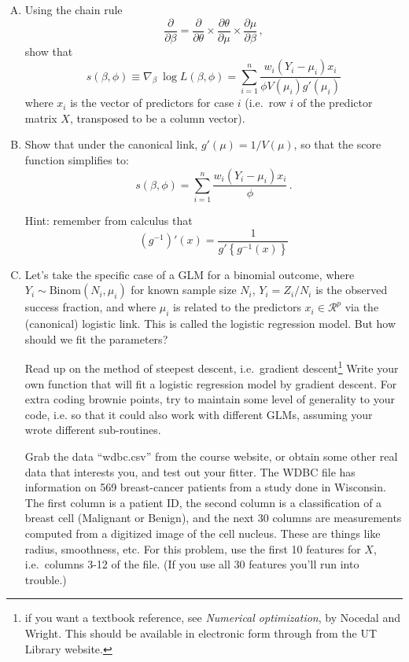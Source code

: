 \documentclass[11pt]{article}
\begin{document}
\begin{enumerate}[(A)]

\item Using the chain rule
$$
\frac{\partial}{\partial \beta} = \frac{\partial}{\partial \theta} \times \frac{\partial \theta}{\partial \mu } \times \frac{\partial \mu}{\partial \beta} \, ,
$$
show that 
$$
s(\beta, \phi) \equiv \nabla_\beta \  \log L(\beta, \phi)  = \sum_{i=1}^n \frac{w_i(Y_i - \mu_i) x_i}{ \phi V(\mu_i) g'(\mu_i)}
$$
where $x_i$ is the vector of predictors for case $i$ (i.e.~row $i$ of the predictor matrix $X$, transposed to be a column vector). 

\item Show that under the canonical link, $g'(\mu) = 1/V(\mu)$, so that the score function simplifies to:  
$$
s(\beta, \phi) = \sum_{i=1}^n \frac{w_i(Y_i - \mu_i) x_i}{ \phi} \, .
$$

Hint: remember from calculus that
$$
(g^{-1})'(x) = \frac{1}{g'\left\{ g^{-1}(x) \right\}}
$$


\item Let's take the specific case of a GLM for a binomial outcome, where $Y_i \sim \mbox{Binom}(N_i, \mu_i)$ for known sample size $N_i$, $Y_i = Z_i/N_i$ is the observed success fraction, and where $\mu_i$ is related to the predictors $x_i \in \mathcal{R}^p$ via the (canonical) logistic link.  This is called the logistic regression model.  But how should we fit the parameters?

Read up on the method of steepest descent, i.e.~gradient descent\footnote{if you want a textbook reference, see \textit{Numerical optimization}, by Nocedal and Wright. This should be available in electronic form through from the UT Library website.}  Write your own function that will fit a logistic regression model by gradient descent.  For extra coding brownie points, try to maintain some level of generality to your code, i.e. so that it could also work with different GLMs, assuming your wrote different sub-routines.  

Grab the data ``wdbc.csv'' from the course website, or obtain some other real data that interests you, and test out your fitter.  The WDBC file has information on 569 breast-cancer patients from a study done in Wisconsin.  The first column is a patient ID, the second column is a classification of a breast cell (Malignant or Benign), and the next 30 columns are measurements computed from a digitized image of the cell nucleus.  These are things like radius, smoothness, etc.  For this problem, use the first 10 features for $X$, i.e.~columns 3-12 of the file.  (If you use all 30 features you'll run into trouble.) 


\end{enumerate}
\end{document}

